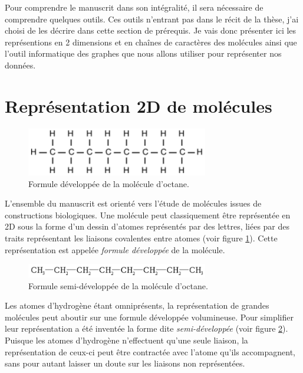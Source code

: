 Pour comprendre le manuscrit dans son intégralité, il sera nécessaire de comprendre quelques outils.
Ces outils n'entrant pas dans le récit de la thèse, j'ai choisi de les décrire dans cette section de prérequis.
Je vais donc présenter ici les représentions en 2 dimensions et en chaînes de caractères des molécules ainsi que l'outil informatique des graphes que nous allons utiliser pour représenter nos données.

\section{Représentation 2D de molécules}

\begin{figure}[h!]
  \begin{center}
    \includegraphics[width=300px]{Figures/Prerequis/developpee.png}
    \caption{\label{dev}Formule développée de la molécule d'octane.}
  \end{center}
\end{figure}

L'ensemble du manuscrit est orienté vers l'étude de molécules issues de constructions biologiques.
Une molécule peut classiquement être représentée en 2D sous la forme d'un dessin d'atomes représentés par des lettres, liées par des traits représentant les liaisons covalentes entre atomes (voir figure \ref{dev}).
Cette représentation est appelée \textit{formule développée} de la molécule.

\begin{figure}[h!]
  \begin{center}
    \includegraphics[width=300px]{Figures/Prerequis/semi.png}
    \caption{\label{semi}Formule semi-développée de la molécule d'octane.}
  \end{center}
\end{figure}

Les atomes d'hydrogène étant omniprésents, la représentation de grandes molécules peut aboutir sur une formule développée volumineuse.
Pour simplifier leur représentation a été inventée la forme dite \textit{semi-développée} (voir figure \ref{semi}).
Puisque les atomes d'hydrogène n'effectuent qu'une seule liaison, la représentation de ceux-ci peut être contractée avec l'atome qu'ils accompagnent, sans pour autant laisser un doute sur les liaisons non représentées.


